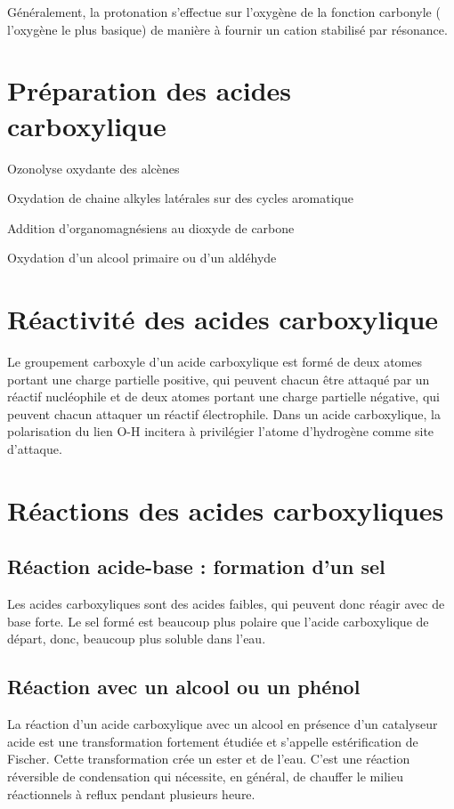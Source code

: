 Généralement, la protonation s'effectue sur l'oxygène de la fonction carbonyle ( l'oxygène le plus basique) de manière à fournir un cation stabilisé par résonance.

\section{Préparation des acides carboxylique}
{Ozonolyse oxydante des alcènes}

{Oxydation de chaine alkyles latérales sur des cycles aromatique}

{Addition d'organomagnésiens au dioxyde de carbone}

{Oxydation d'un alcool primaire ou d'un aldéhyde}


\section{Réactivité des acides carboxylique}
Le groupement carboxyle d'un acide carboxylique est formé de deux atomes portant une charge partielle positive, qui peuvent chacun être attaqué par un réactif nucléophile et de deux atomes portant une charge partielle négative, qui peuvent chacun attaquer un réactif électrophile.
Dans un acide carboxylique, la polarisation du lien O-H incitera à privilégier l'atome d'hydrogène comme site d'attaque.

\section{Réactions des acides carboxyliques}
\subsection{Réaction acide-base : formation d'un sel}
Les acides carboxyliques sont des acides faibles, qui peuvent donc réagir avec de base forte.
Le sel formé est beaucoup plus polaire que l'acide carboxylique de départ, donc, beaucoup plus soluble dans l'eau.

\subsection{Réaction avec un alcool ou un phénol}
La réaction d'un acide carboxylique avec un alcool en présence d'un catalyseur acide est une transformation fortement étudiée et s'appelle estérification de Fischer.
Cette transformation crée un ester et de l'eau.
C'est une réaction réversible de condensation qui nécessite, en général, de chauffer le milieu réactionnels à reflux pendant plusieurs heure.




